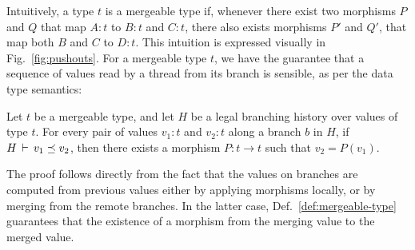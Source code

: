 Intuitively, a type $t$ is a mergeable type if, whenever there exist
two morphisms $P$ and $Q$ that map $A:t$ to $B:t$ and $C:t$, there
also exists morphisms $P'$ and $Q'$, that map both $B$ and $C$ to
$D:t$. This intuition is expressed visually in
Fig.~\ref{fig:pushouts}.  For a mergeable type $t$, we have the
guarantee that a sequence of values read by a thread from its branch
is sensible, as per the data type semantics:

\begin{theorem} 
\label{thm:branch-consistency}
Let $t$ be a mergeable type, and let $H$ be a legal branching history
over values of type $t$. For every pair of values $v_1:t$ and $v_2:t$
along a branch $b$ in $H$, if $H\,\vdash\,v_1 \preceq v_2$, then there
exists a morphism $P:t\rightarrow t$ such that $v_2 = P(v_1)$.
\end{theorem}

The proof follows directly from the fact that the values on branches
are computed from previous values either by applying morphisms
locally, or by merging from the remote branches. In the latter case,
Def.~\ref{def:mergeable-type} guarantees that the existence of a
morphism from the merging value to the merged value.

